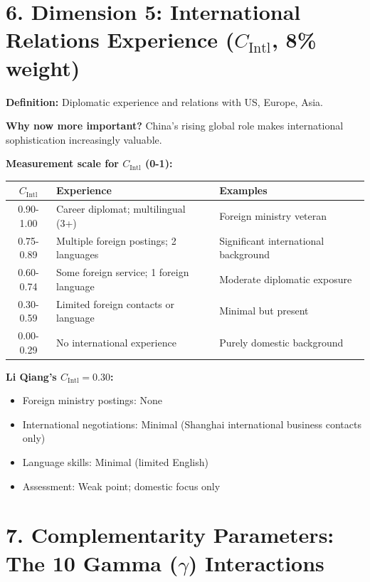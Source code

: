 \documentclass[11pt]{article}
\begin{document}
\section{6. Dimension 5: International Relations Experience ($C_{\text{Intl}}$, 8\% weight)}

\textbf{Definition:} Diplomatic experience and relations with US, Europe, Asia.

\textbf{Why now more important?} China's rising global role makes international sophistication increasingly valuable.

\textbf{Measurement scale for $C_{\text{Intl}}$ (0-1):}

\begin{table}[h]
\centering
\begin{tabular}{|c|l|l|}
\hline
$C_{\text{Intl}}$ & \textbf{Experience} & \textbf{Examples} \\
\hline
0.90-1.00 & Career diplomat; multilingual (3+) & Foreign ministry veteran \\
0.75-0.89 & Multiple foreign postings; 2 languages & Significant international background \\
0.60-0.74 & Some foreign service; 1 foreign language & Moderate diplomatic exposure \\
0.30-0.59 & Limited foreign contacts or language & Minimal but present \\
0.00-0.29 & No international experience & Purely domestic background \\
\hline
\end{tabular}
\end{table}

\textbf{Li Qiang's $C_{\text{Intl}} = 0.30$:}
\begin{itemize}
\item Foreign ministry postings: None
\item International negotiations: Minimal (Shanghai international business contacts only)
\item Language skills: Minimal (limited English)
\item Assessment: Weak point; domestic focus only
\end{itemize}

\section{7. Complementarity Parameters: The 10 Gamma ($\gamma$) Interactions}
\end{document}
